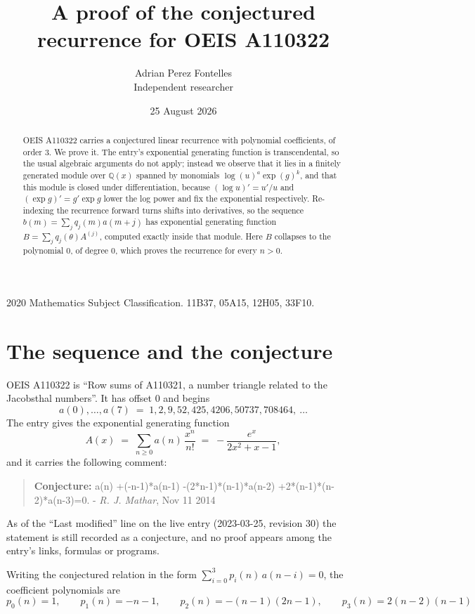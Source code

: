 \documentclass[11pt,a4paper]{article}
\title{A proof of the conjectured recurrence for OEIS A110322}
\author{Adrian Perez Fontelles\\ \small Independent researcher}
\date{25 August 2026}
\theoremstyle{plain}
\theoremstyle{definition}
\begin{document}
\maketitle

\begin{abstract}
OEIS A110322 carries a conjectured linear recurrence with polynomial coefficients, of
order 3. We prove it. The entry's exponential generating function is
transcendental, so the usual algebraic arguments do not apply; instead we observe that it
lies in a finitely generated module over $\mathbb{Q}(x)$ spanned by monomials
$\log(u)^{a}\exp(g)^{k}$, and that this module is closed under differentiation, because
$(\log u)'=u'/u$ and $(\exp g)'=g'\exp g$ lower the log power and fix the exponential
respectively. Re-indexing the recurrence forward turns shifts into derivatives, so the
sequence $b(m)=\sum_{j}q_{j}(m)a(m+j)$ has exponential generating function
$B=\sum_{j}q_{j}(\theta)A^{(j)}$, computed exactly inside that module. Here $B$ collapses
to the polynomial $0$, of degree $0$, which proves the recurrence for every
$n>0$.
\end{abstract}

\noindent\small 2020 Mathematics Subject Classification. 11B37, 05A15, 12H05, 33F10.\normalsize

\section{The sequence and the conjecture}

OEIS A110322 is ``Row sums of A110321, a number triangle related to the Jacobsthal numbers''. It has offset $0$ and begins
\[
a(0),\dots,a(7)\;=\;1, 2, 9, 52, 425, 4206, 50737, 708464,\ \dots
\]
The entry gives the exponential generating function
\begin{equation}\label{eq:gf}
A(x)\;=\;\sum_{n\ge 0} a(n)\,\frac{x^{n}}{n!}\;=\;- \frac{e^{x}}{2 x^{2} + x - 1} ,
\end{equation}
and it carries the following comment:
\begin{quote}\small
\textbf{Conjecture:} a(n) +(-n-1)*a(n-1) -(2*n-1)*(n-1)*a(n-2) +2*(n-1)*(n-2)*a(n-3)=0. - \emph{R. J. Mathar}, Nov 11 2014
\end{quote}
As of the ``Last modified'' line on the live entry (2023-03-25, revision 30) the
statement is still recorded as a conjecture, and no proof appears among the entry's links,
formulas or programs.

Writing the conjectured relation in the form $\sum_{i=0}^{3}p_{i}(n)\,a(n-i)=0$,
the coefficient polynomials are
\[
p_{0}(n)=1,\qquad p_{1}(n)=- n - 1,\qquad p_{2}(n)=- \left(n - 1\right) \left(2 n - 1\right),\qquad p_{3}(n)=2 \left(n - 2\right) \left(n - 1\right)
\]
\end{document}
